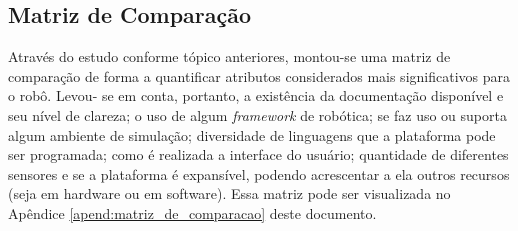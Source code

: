 \subsection{Matriz de Comparação}

Através do estudo conforme tópico anteriores, montou-se uma matriz de comparação de forma a
quantificar atributos considerados mais significativos para o robô. Levou- se em conta, portanto, a existência da documentação disponível e seu nível de clareza; o uso de algum \textit{framework} de robótica; se faz uso ou suporta algum ambiente de simulação; diversidade de linguagens que a
plataforma pode ser programada; como é realizada a interface do usuário; quantidade de diferentes sensores e se a plataforma é expansível, podendo acrescentar a ela outros recursos (seja em hardware ou em software). Essa matriz pode ser visualizada no Apêndice \ref{apend:matriz_de_comparacao} deste documento.